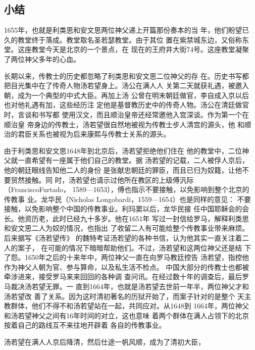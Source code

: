 \subsection{小结}
\par
1655年，也就是利类思和安文思两位神父递上开篇那份奏本的当%
年，他们盼望已久的教堂终于落成。教堂取名圣若瑟教堂。由于其位%
置在紫禁城东边，又俗称东堂。这座教堂今天是北京的一个景点，在%
现在的王府井大街74号。这座教堂凝聚了两位神父多年的心血。%
\par
长期以来，传教士的历史都忽略了利类思和安文思二位神父的存%
在。历史书写都把目光集中在了传奇人物汤若望身上。汤公在满人人%
关第二天就获礼遇，被邀入朝，成为一个典型的中式大臣。再加上汤%
公曾在明末朝廷做官，李自成入京以后也对他礼遇有加，这些经历注%
定他是基督教历史中的传奇人物。汤公在清廷做官时，言谈和书写都%
使用汉文，而且顺治皇帝还经常邀他入宫深谈。作为第一个在顺治皇%
帝身边的传教士，汤若望很自然地被视为传教士步人清宫的源头，他%
和顺治的君臣关系也被视为后来康熙与传教士关系的源头。%
\par
由于利类思和安文思1648年到北京后，汤若望拒绝他们住在%
他的教堂中，二位神父就一直希望有一座属于他们自己的教堂。据%
汤若望的记载，二人被俘人京后，他的朝廷眼线告知他二人的身份%
是张献忠朝廷的罪臣，而且已归为奴籍，让他不要贸然接触。同%
时，汤若望也请示过他所在教区的上级傅汎际（FranciscoFurtado，%
1589—1653），傅也指示不要接触，以免影响到整个北京的传教事%
业。龙华民（Nicholas Longobardi，1559—1654）也是同样的意见：%
不要接触，以免影响整个中国的传教事业。利玛窦以后，龙华民接%
任中国耶稣会的会长。他资历老，此时已经九十多岁。他在1651年%
写过一封信给罗马，解释利类思和安文思二人为奴的情况，也指出%
了收留二人有可能给整个传教事业带来麻烦。后来据写《汤若望传》%
的魏特考证汤若望的各种书信，认为他其实一直关注着二人的案子，%
在可能的情况下暗暗帮助他们。不过，汤若望和这两位神父还是结%
下了怨。1650年之后的十来年中，两位神父一直在向罗马教廷控告%
汤若望，指控他作为神父人朝为官、参与算命，以及私生活不检点。%
中国大部分的传教士也都被牵涉进来，接受罗马来来回回的各种调%
查问讯。在经过数十年的调查后，最后罗马裁决汤若望无罪。一%
直到1664年，也就是汤若望去世前一年半，两位神父才和汤若望改%
善了关系。因为这时清初著名的历狱开始了，而案子针对的是整个%
天主教群体，他们不得不和汤若望站在一起，共同应对。从1648到%
1664年，两位神父和汤若望神父之间有16年时间的对立，这也意味%
着两个群体在满人占领下的北京按着自己的路线互不来往地开辟着%
各自的传教事业。%
\par
汤若望在满人人京后降清，然后仕途一帆风顺，成为了清初大臣，%
